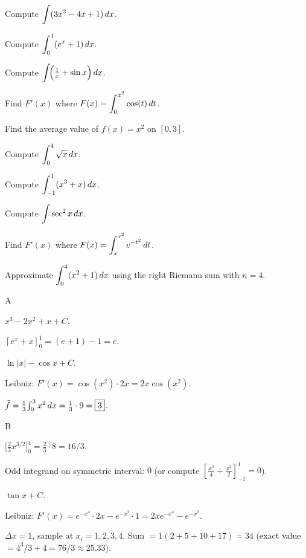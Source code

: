 \documentclass[11pt]{article}
\begin{document}
\begin{problems}
\item Compute $\displaystyle \int (3x^2 - 4x + 1) \,dx$.
\item Compute $\displaystyle \int_0^1 (e^x + 1) \,dx$.
\item Compute $\displaystyle \int \!\Bigl(\tfrac{1}{x} + \sin x\Bigr) \,dx$.
\item Find $F'(x)$ where $F(x) = \displaystyle \int_0^{x^2} \cos(t) \,dt$.
\item Find the average value of $f(x) = x^2$ on $[0, 3]$.
\end{problems}

\vfill
\newpage
{}
\begin{problems}
\item Compute $\displaystyle \int_0^4 \sqrt{x} \,dx$.
\item Compute $\displaystyle \int_{-1}^{1} (x^3 + x) \,dx$.
\item Compute $\displaystyle \int \sec^2 x \,dx$.
\item Find $F'(x)$ where $F(x) = \displaystyle \int_x^{x^2} e^{-t^2} \,dt$.
\item Approximate $\displaystyle \int_0^4 (x^2 + 1) \,dx$ using the right Riemann sum with $n=4$.
\end{problems}

\vfill
\newpage
{}

\begin{answers}{A}
\item $\boxed{x^3 - 2x^2 + x + C}$.
\item $[e^x + x]_0^1 = (e + 1) - 1 = \boxed{e}$.
\item $\boxed{\ln|x| - \cos x + C}$.
\item Leibniz: $F'(x) = \cos(x^2) \cdot 2x = \boxed{2x \cos(x^2)}$.
\item $\bar f = \tfrac{1}{3}\!\int_0^3 x^2 \,dx = \tfrac{1}{3} \cdot 9 = \boxed{3}$.
\end{answers}

\begin{answers}{B}
\item $\bigl[\tfrac{2}{3} x^{3/2}\bigr]_0^4 = \tfrac{2}{3} \cdot 8 = \boxed{16/3}$.
\item Odd integrand on symmetric interval: $\boxed{0}$ (or compute $[\tfrac{x^4}{4} + \tfrac{x^2}{2}]_{-1}^{1} = 0$).
\item $\boxed{\tan x + C}$.
\item Leibniz: $F'(x) = e^{-x^4} \cdot 2x - e^{-x^2} \cdot 1 = \boxed{2x e^{-x^4} - e^{-x^2}}$.
\item $\Delta x = 1$, sample at $x_i = 1,2,3,4$. Sum $= 1(2 + 5 + 10 + 17) = \boxed{34}$ (exact value $= 4^3/3 + 4 = 76/3 \approx 25.33$).
\end{answers}
\end{document}
